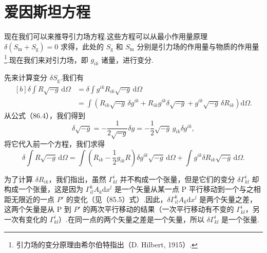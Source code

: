 \section{爱因斯坦方程}

现在我们可以来推导引力场方程.这些方程可以从最小作用量原理 $\delta(S_{\mathrm{m}}+S_{\mathrm{g}})=0$ 求得，此处的 $S_{\mathrm{g}}$ 和 $S_{\mathrm{m}}$ 分别是引力场的作用量与物质的作用量\footnote{引力场的变分原理由希尔伯特指出（D. Hilbert, 1915）.}.现在我们来对引力场，即 $g_{ik}$ 诸量，进行变分.

先来计算变分 $\delta S_{\mathrm{g}}$.我们有
\begin{equation*}
\begin{aligned}[b]
  \delta\int R\sqrt{-g}\,\mathrm{d}\varOmega
  &=\delta\int g^{ik}R_{ik}\sqrt{-g}\,\mathrm{d}\varOmega\\
  &=\int\left(R_{ik}\sqrt{-g}\,\delta g^{ik}
  +R_{ik}g^{ik}\delta\sqrt{-g}
  +g^{ik}\sqrt{-g}\,\delta R_{ik}\right)\mathrm{d}\varOmega.
\end{aligned}
\end{equation*}
从公式（86.4），我们得到
\begin{equation*}
  \delta\sqrt{-g}=-\frac{1}{2\sqrt{-g}}\delta g
  =-\frac{1}{2}\sqrt{-g}\,g_{ik}\delta g^{ik},
\end{equation*}
将它代入前一个方程，我们求得
\begin{equation}
  \delta\int R\sqrt{-g}\,\mathrm{d}\varOmega
  =\int\left(R_{ik}-\frac{1}{2}g_{ik}R\right)\delta g^{ik}\sqrt{-g}\,\mathrm{d}\varOmega
  +\int g^{ik}\delta R_{ik}\sqrt{-g}\,\mathrm{d}\varOmega.
\end{equation}

为了计算 $\delta R_{ik}$，我们指出，虽然 $\Gamma^i_{kl}$ 并不构成一个张量，但是它们的变分 $\delta\Gamma^i_{kl}$ 却构成一个张量，这是因为 $\Gamma^k_{il}A_k\mathrm{d}x^l$ 是一个矢量从某一点 P 平行移动到一个与之相距无限近的一点 $P'$ 的变化（见（85.5）式）.因此，$\delta\Gamma^k_{il}A_k\mathrm{d}x^l$ 是两个矢量之差，这两个矢量是从 P 到 $P'$ 的两次平行移动的结果（一次平行移动有不变的 $\Gamma^i_{kl}$，另一次有变化的 $\Gamma^i_{kl}$）.在同一点的两个矢量之差是一个矢量，所以 $\delta\Gamma^i_{kl}$ 是一个张量.

